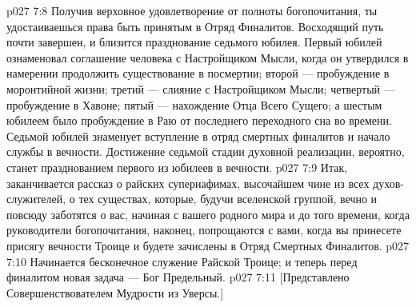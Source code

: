 \vs p027 7:8 \pc Получив верховное удовлетворение от полноты богопочитания, ты удостаиваешься права быть принятым в Отряд Финалитов. Восходящий путь почти завершен, и близится празднование седьмого юбилея. Первый юбилей ознаменовал соглашение человека с Настройщиком Мысли, когда он утвердился в намерении продолжить существование в посмертии; второй --- пробуждение в моронтийной жизни; третий --- слияние с Настройщиком Мысли; четвертый --- пробуждение в Хавоне; пятый --- нахождение Отца Всего Сущего; а шестым юбилеем было пробуждение в Раю от последнего переходного сна во времени. Седьмой юбилей знаменует вступление в отряд смертных финалитов и начало службы в вечности. Достижение седьмой стадии духовной реализации, вероятно, станет празднованием первого из юбилеев в вечности.
\vs p027 7:9 \pc Итак, заканчивается рассказ о райских супернафимах, высочайшем чине из всех духов\hyp{}служителей, о тех существах, которые, будучи вселенской группой, вечно и повсюду заботятся о вас, начиная с вашего родного мира и до того времени, когда руководители богопочитания, наконец, попрощаются с вами, когда вы принесете присягу вечности Троице и будете зачислены в Отряд Смертных Финалитов.
\vs p027 7:10 Начинается бесконечное служение Райской Троице; и теперь перед финалитом новая задача --- Бог Предельный.
\vsetoff
\vs p027 7:11 [Представлено Совершенствователем Мудрости из Уверсы.]
